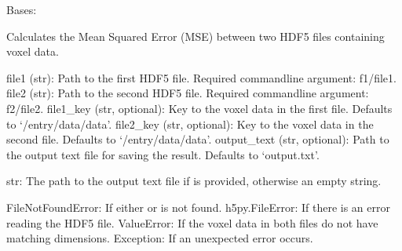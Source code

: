 \documentclass[letterpaper,10pt,english]{sphinxmanual}
\begin{document}
\begin{fulllineitems}
\label{\detokenize{cometr.global_metrics:cometr.global_metrics.MSE.MSE}}
\pysigstartsignatures
{}
\pysigstopsignatures
\sphinxAtStartPar
Bases: 

\sphinxAtStartPar
Calculates the Mean Squared Error (MSE) between two HDF5 files containing voxel data.
\begin{description}
\sphinxAtStartPar
file1 (str): Path to the first HDF5 file. Required command\sphinxhyphen{}line argument: \sphinxhyphen{}f1/\textendash{}file1.
file2 (str): Path to the second HDF5 file. Required command\sphinxhyphen{}line argument: \sphinxhyphen{}f2/\textendash{}file2.
file1\_key (str, optional): Key to the voxel data in the first file. Defaults to ‘/entry/data/data’.
file2\_key (str, optional): Key to the voxel data in the second file. Defaults to ‘/entry/data/data’.
output\_text (str, optional): Path to the output text file for saving the result. Defaults to ‘output.txt’.

\sphinxAtStartPar
str: The path to the output text file if  is provided, otherwise an empty string.

\sphinxAtStartPar
FileNotFoundError: If either  or  is not found.
h5py.FileError: If there is an error reading the HDF5 file.
ValueError: If the voxel data in both files do not have matching dimensions.
Exception: If an unexpected error occurs.


\end{description}
\end{fulllineitems}
\end{document}
